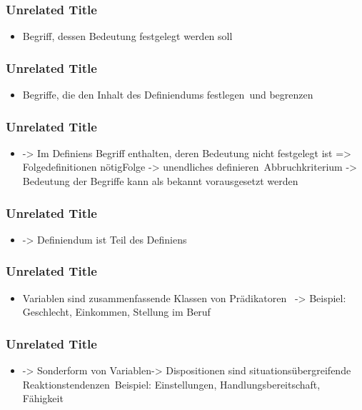 \documentclass[aspectratio=169]{beamer}
\begin{document}
\begin{frame}
\frametitle{Unrelated Title}


\begin{itemize}
\item Begriff, dessen Bedeutung festgelegt werden soll
\end{itemize}

\note[item]{}
\end{frame}
\begin{frame}
\frametitle{Unrelated Title}


\begin{itemize}
\item Begriffe, die den Inhalt des Definiendums festlegen und begrenzen
\end{itemize}

\note[item]{}
\end{frame}
\begin{frame}
\frametitle{Unrelated Title}


\begin{itemize}
\item -> Im Definiens Begriff enthalten, deren Bedeutung nicht festgelegt ist => Folgedefinitionen nötigFolge -> unendliches definieren Abbruchkriterium -> Bedeutung der Begriffe kann als bekannt vorausgesetzt werden
\end{itemize}

\note[item]{}
\end{frame}
\begin{frame}
\frametitle{Unrelated Title}


\begin{itemize}
\item -> Definiendum ist Teil des Definiens 
\end{itemize}

\note[item]{}
\end{frame}
\begin{frame}
\frametitle{Unrelated Title}


\begin{itemize}
\item Variablen sind zusammenfassende Klassen von Prädikatoren  -> Beispiel: Geschlecht, Einkommen, Stellung im Beruf 
\end{itemize}

\note[item]{}
\end{frame}
\begin{frame}
\frametitle{Unrelated Title}


\begin{itemize}
\item -> Sonderform von Variablen-> Dispositionen sind situationsübergreifende Reaktionstendenzen Beispiel: Einstellungen, Handlungsbereitschaft, Fähigkeit 
\end{itemize}

\note[item]{}
\end{frame}
\end{document}
